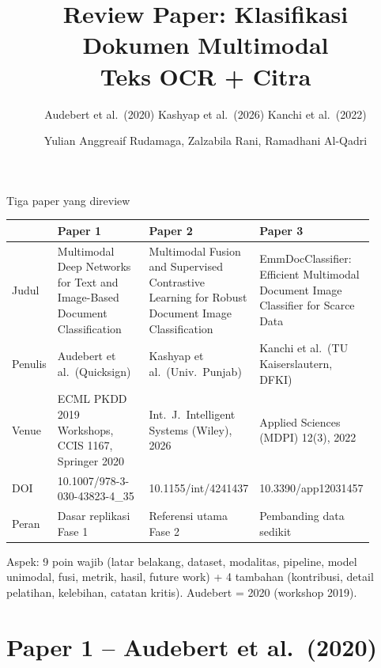 \documentclass[aspectratio=169,10pt]{beamer}
\title{Review Paper: Klasifikasi Dokumen Multimodal\\Teks OCR + Citra}
\subtitle{Audebert et al.\ (2020) \textbullet{} Kashyap et al.\ (2026) \textbullet{} Kanchi et al.\ (2022)}
\author{Yulian Anggreaif Rudamaga, Zalzabila Rani, Ramadhani Al-Qadri}
\institute{Analisis \& Pemrosesan Data Multimodal -- Magister Ilmu Komputer, FILKOM UB}
\date{}
\newcommand\kecil{\fontsize{8}{9.5}\selectfont}
\begin{document}
\maketitle

\begin{frame}{Tiga paper yang direview}
  \kecil
  \setlength\tabcolsep{3pt}
  \begin{tabular}{L{0.1\linewidth}L{0.27\linewidth}L{0.27\linewidth}L{0.27\linewidth}}
    \toprule
    & \textbf{Paper 1} & \textbf{Paper 2} & \textbf{Paper 3} \\ \midrule
    Judul & Multimodal Deep Networks for Text and Image-Based Document Classification
          & Multimodal Fusion and Supervised Contrastive Learning for Robust Document Image Classification
          & EmmDocClassifier: Efficient Multimodal Document Image Classifier for Scarce Data \\[1pt]
    Penulis & Audebert et al.\ (Quicksign) & Kashyap et al.\ (Univ.\ Punjab) & Kanchi et al.\ (TU Kaiserslautern, DFKI) \\[1pt]
    Venue & ECML PKDD 2019 Workshops, CCIS 1167, Springer 2020 & Int.\ J.\ Intelligent Systems (Wiley), 2026 & Applied Sciences (MDPI) 12(3), 2022 \\[1pt]
    DOI & 10.1007/978-3-030-43823-4\_35 & 10.1155/int/4241437 & 10.3390/app12031457 \\[1pt]
    Peran & Dasar replikasi Fase 1 & Referensi utama Fase 2 & Pembanding data sedikit \\ \bottomrule
  \end{tabular}

  \vspace{2pt}
  {\kecil Aspek: 9 poin wajib (latar belakang, dataset, modalitas, pipeline, model unimodal,
  fusi, metrik, hasil, future work) + 4 tambahan (kontribusi, detail pelatihan, kelebihan,
  \alert{catatan kritis}). Audebert = 2020 (workshop 2019).}
\end{frame}

\section{Paper 1 -- Audebert et al.\ (2020)}
\end{document}
